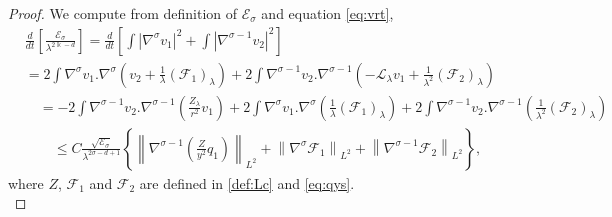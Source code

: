 \documentclass[11pt]{aims}
\theoremstyle{definition}
\numberwithin{equation}{section}
\begin{document}
\begin{proof} We compute from definition of ${\mathscr{E}}_\sigma$ and equation \eqref{eq:vrt}, 
\begin{align}
&\frac{d}{dt}\left[\frac{{\mathscr{E}}_\sigma}{\lambda^{2\Bbbk -d }} \right] = \frac{d}{dt}\left[\int |\nabla^\sigma v_1|^2 + \int |\nabla^{\sigma- 1}v_2|^2\right]\nonumber\\
& = 2\int \nabla^\sigma v_1. \nabla^\sigma \left(v_2 + \frac{1}{\lambda}({\mathcal{F}}_1)_\lambda\right) + 2\int \nabla^{\sigma - 1} v_2. \nabla^{\sigma - 1} \left(- {\mathscr{L}}_\lambda v_1 + \frac{1}{\lambda^2}({\mathcal{F}}_2)_\lambda\right)\nonumber\\
& \quad = -2\int \nabla^{\sigma - 1}v_2.\nabla^{\sigma - 1}\left(\frac{Z_\lambda}{r^2}v_1\right) +   2\int \nabla^\sigma v_1. \nabla^\sigma \left(\frac{1}{\lambda}({\mathcal{F}}_1)_\lambda\right) + 2\int \nabla^{\sigma - 1} v_2. \nabla^{\sigma - 1} \left(\frac{1}{\lambda^2}({\mathcal{F}}_2)_\lambda\right)\nonumber\\
& \qquad \leq C\frac{\sqrt{{\mathscr{E}}_\sigma}}{\lambda^{2\sigma -d + 1}}\left\{\left\|\nabla^{\sigma - 1}\left(\frac{Z}{y^2}q_1\right) \right\|_{L^2} + \left\|\nabla^\sigma {\mathcal{F}}_1\right\|_{L^2} + \left\|\nabla^{\sigma - 1} {\mathcal{F}}_2 \right\|_{L^2}    \right\},\label{id:Esigma}
\end{align}
where $Z$, ${\mathcal{F}}_1$ and ${\mathcal{F}}_2$ are defined in \eqref{def:Lc} and \eqref{eq:qys}.\\


\end{proof}
\end{document}
